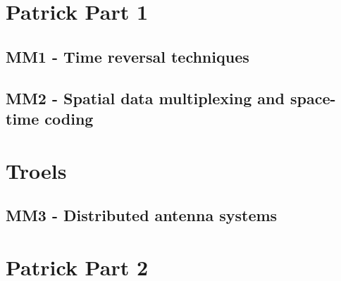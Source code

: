 



    \singlespacing
    \pagestyle{empty}	
	
	\cleardoublepage
	
	\pagestyle{plain}
		
	\tableofcontents 
	\onehalfspacing
	\pagestyle{fancy} %
    \setcounter{page}{0} %

\part{Patrick Part 1}

\chapter{MM1 - Time reversal techniques}







\chapter{MM2 - Spatial data multiplexing and space-time coding}






\part{Troels}

\chapter{MM3 - Distributed antenna systems}







\part{Patrick Part 2}
